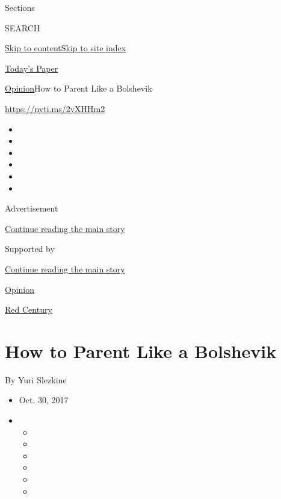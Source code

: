Sections

SEARCH

\protect\hyperlink{site-content}{Skip to
content}\protect\hyperlink{site-index}{Skip to site index}

\href{https://myaccount.nytimes3xbfgragh.onion/auth/login?response_type=cookie\&client_id=vi}{}

\href{https://www.nytimes3xbfgragh.onion/section/todayspaper}{Today's
Paper}

\href{/section/opinion}{Opinion}\textbar{}How to Parent Like a Bolshevik

\url{https://nyti.ms/2yXHHm2}

\begin{itemize}
\item
\item
\item
\item
\item
\item
\end{itemize}

Advertisement

\protect\hyperlink{after-top}{Continue reading the main story}

Supported by

\protect\hyperlink{after-sponsor}{Continue reading the main story}

\href{/section/opinion}{Opinion}

\href{/column/red-century}{Red Century}

\hypertarget{how-to-parent-like-a-bolshevik}{%
\section{How to Parent Like a
Bolshevik}\label{how-to-parent-like-a-bolshevik}}

By Yuri Slezkine

\begin{itemize}
\item
  Oct. 30, 2017
\item
  \begin{itemize}
  \item
  \item
  \item
  \item
  \item
  \item
  \end{itemize}
\end{itemize}


